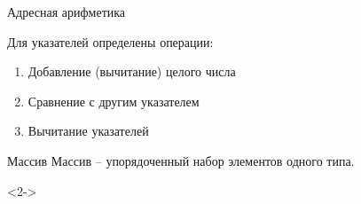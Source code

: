 \documentclass[aspectratio=169,14pt]{beamer}
\begin{document}
    \begin{frame}{Адресная арифметика}
        \begin{block}{Для указателей определены операции:}
            \begin{enumerate}
                \item Добавление (вычитание) целого числа
                \item Сравнение с другим указателем
                \item Вычитание указателей
            \end{enumerate}
        \end{block}
    \end{frame}

    \begin{frame}[fragile,t]{Массив}
        Массив -- упорядоченный набор элементов одного типа.
        \begin{onlyenv}<2->
            \begin{center}
\end{center}
\end{onlyenv}
\end{frame}
\end{document}
